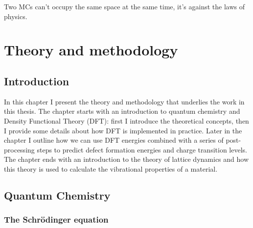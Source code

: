 \begin{savequote}[8cm]
Two MCs can't occupy the same space at the same time,
it's against the laws of physics.
\end{savequote}

\chapter{\label{ch:3-methods}Theory and methodology}

\minitoc



\section{Introduction} 

In this chapter I present the theory and methodology that underlies the work in this thesis. The chapter starts with an introduction to quantum chemistry and Density Functional Theory (DFT): first I introduce the theoretical concepts, then I provide some details about how DFT is implemented in practice. Later in the chapter I outline how we can use DFT energies combined with a series of post-processing steps to predict defect formation energies and charge transition levels. The chapter ends with an introduction to the theory of lattice dynamics and how this theory is used to calculate the vibrational properties of a material. 

\section{Quantum Chemistry}

\subsection{The Schr\"{o}dinger equation}


